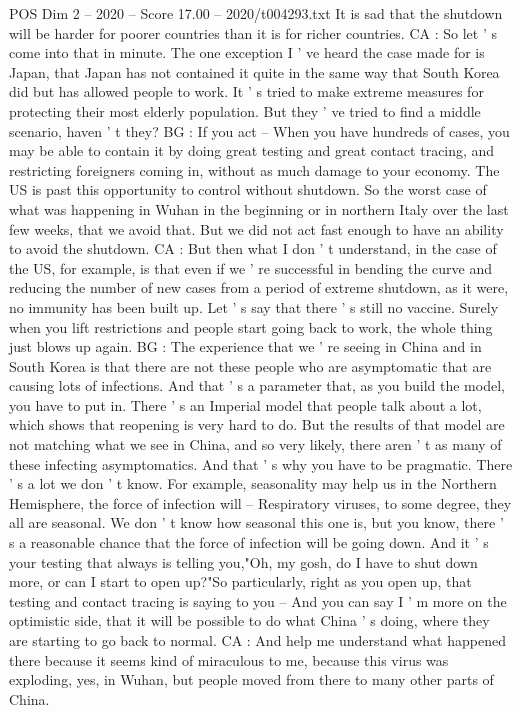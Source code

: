 \begin{textsample}{POS Dim 2 – 2020 – Score 17.00 – 2020/t004293.txt}
It is sad that the shutdown will be harder for poorer countries than it is for richer countries.
CA : So let ' s come into that in minute.
The one exception I ' ve heard the case made for is Japan, that Japan has not contained it quite in the same way that South Korea did but has allowed people to work.
It ' s tried to make extreme measures for protecting their most elderly population.
But they ' ve tried to find a middle scenario, haven ' t they?
BG : If you act -- When you have hundreds of cases, you may be able to contain it by doing great testing and great contact tracing, and restricting foreigners coming in, without as much damage to your economy.
The US is past this opportunity to control without shutdown.
So the worst case of what was happening in Wuhan in the beginning or in northern Italy over the last few weeks, that we avoid that.
But we did not act fast enough to have an ability to avoid the shutdown.
CA : But then what I don ' t understand, in the case of the US, for example, is that even if we ' re successful in bending the curve and reducing the number of new cases from a period of extreme shutdown, as it were, no immunity has been built up.
Let ' s say that there ' s still no vaccine.
Surely when you lift restrictions and people start going back to work, the whole thing just blows up again.
BG : The experience that we ' re seeing in China and in South Korea is that there are not these people who are asymptomatic that are causing lots of infections.
And that ' s a parameter that, as you build the model, you have to put in.
There ' s an Imperial model that people talk about a lot, which shows that reopening is very hard to do.
But the results of that model are not matching what we see in China, and so very likely, there aren ' t as many of these infecting asymptomatics.
And that ' s why you have to be pragmatic.
There ' s a lot we don ' t know.
For example, seasonality may help us in the Northern Hemisphere, the force of infection will -- Respiratory viruses, to some degree, they all are seasonal.
We don ' t know how seasonal this one is, but you know, there ' s a reasonable chance that the force of infection will be going down.
And it ' s your testing that always is telling you,"Oh, my gosh, do I have to shut down more, or can I start to open up?"So particularly, right as you open up, that testing and contact tracing is saying to you -- And you can say I ' m more on the optimistic side, that it will be possible to do what China ' s doing, where they are starting to go back to normal.
CA : And help me understand what happened there because it seems kind of miraculous to me, because this virus was exploding, yes, in Wuhan, but people moved from there to many other parts of China.

\end{textsample}
